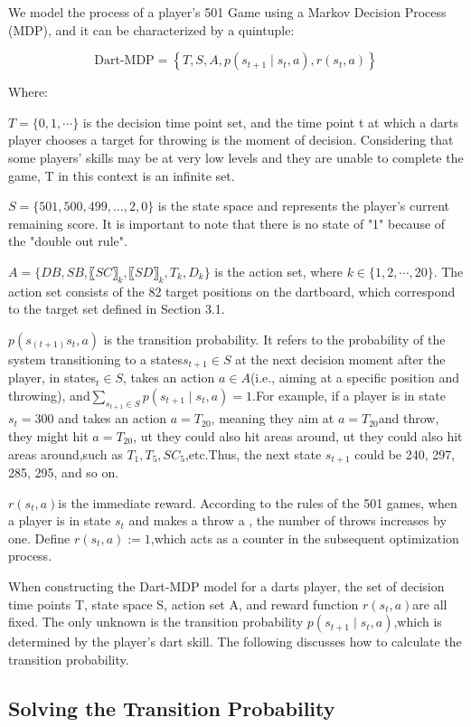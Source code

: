 \documentclass[cjjs]{ipart}
\theoremstyle{plain}
\begin{document}
We model the process of a player's 501 Game using a Markov Decision Process (MDP), and it can be characterized by a quintuple:

\[
\text{Dart-MDP} = \left\{ T, S, A, p(s_{t+1} \mid s_t, a), r(s_t, a) \right\}
\]

Where:  

$T= \{ 0, 1, \cdots\}$ is the decision time point set, and the time point t at which a darts player chooses a target for throwing is the moment of decision. Considering that some players’ skills may be at very low levels and they are unable to complete the game, T in this context is an infinite set.

$S = \{501, 500, 499, \dots, 2, 0\}$ is the state space and represents the player's current remaining score. It is important to note that there is no state of "1" because of the "double out rule".

$A=\{ DB,SB,〖SC〗_k  ,〖SD〗_k  ,T_k  ,D_k\}$ is the action set, where $k \in \{ 1, 2,\cdots, 20 \}$. The action set consists of the 82 target positions on the dartboard, which correspond to the target set defined in Section 3.1.

$p(s_(t+1) s_t,a)$ is the transition probability. It refers to the probability of the system transitioning to a states$s_{t+1} \in S$ at the next decision moment after the player, in states$_t \in S$, takes an action $a \in A$(i.e., aiming at a specific position and throwing), and$\sum_{s_{t+1} \in S} p(s_{t+1} \mid s_t, a) = 1$.For example, if a player is in state $s_t = 300$ and takes an action $a = T_{20}$, meaning they aim at $a = T_{20}$and throw, they might hit $a = T_{20}$, ut they could also hit areas around, ut they could also hit areas around,such as $T_1, T_5, SC_5$,etc.Thus, the next state $s_{t+1}$ could be 240, 297, 285, 295, and so on.

$r(s_t,a)$is the immediate reward. According to the rules of the 501 games, when a player is in state $s_t$ and makes a throw a , the number of throws increases by one. Define
$r(s_t, a) := 1$,which acts as a counter in the subsequent optimization process.

When constructing the Dart-MDP model for a darts player, the set of decision time points T, state space S, action set A, and reward function $r(s_t, a)$are all fixed. The only unknown is the transition probability $p(s_{t+1} \mid s_t, a)$,which is determined by the player's dart skill. The following discusses how to calculate the transition probability.

\subsection{Solving the Transition Probability}
\end{document}
